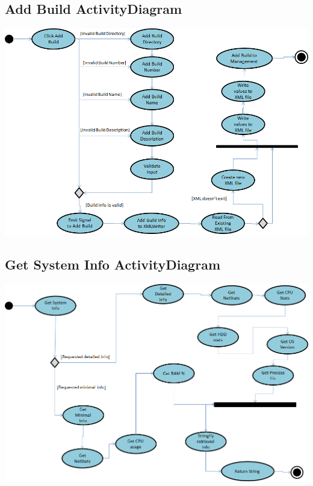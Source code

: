 \documentclass[a4paper,12pt,final]{article}
\begin{document}
\subsection{Add Build ActivityDiagram}
\begin{center}
\includegraphics[scale=0.45]{AddBuildActivity.png} 
\end{center}
\subsection{Get System Info ActivityDiagram}
\begin{center}
\includegraphics[scale=0.45]{GetSystemInfo.png} 
\end{center}
\end{document}
